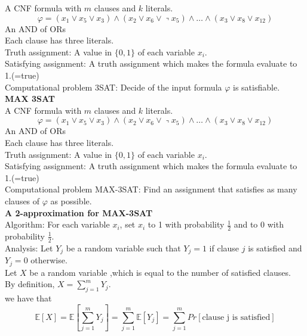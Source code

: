 \documentclass[onecolumn]{report}
\begin{document}
A CNF formula with $m$ clauses and $k$ literals.\\
\begin{equation*}
   \left.\varphi=\left(x_1 \vee x_5 \vee x_3\right) \wedge\left(x_2 \vee x_6 \vee\right\urcorner x_5 \right) \wedge \ldots \wedge\left(x_3 \vee x_8 \vee x_{12}\right)
\end{equation*}
An AND of ORs\\
Each clause has three literals.\\
Truth assignment: A value in $\{0,1\}$ of each variable $x_i$.\\
Satisfying assignment: A truth assignment which makes the formula evaluate to 1.(=true)\\
Computational problem 3SAT: Decide of the input formula $\varphi$ is satisfiable.\\
\textbf{MAX 3SAT}\\
A CNF formula with $m$ clauses and $k$ literals.\\
\begin{equation*}
   \left.\varphi=\left(x_1 \vee x_5 \vee x_3\right) \wedge\left(x_2 \vee x_6 \vee\right\urcorner x_5 \right) \wedge \ldots \wedge\left(x_3 \vee x_8 \vee x_{12}\right)
\end{equation*}
An AND of ORs\\
Each clause has three literals.\\
Truth assignment: A value in $\{0,1\}$ of each variable $x_i$.\\
Satisfying assignment: A truth assignment which makes the formula evaluate to 1.(=true)\\
Computational problem MAX-3SAT: Find an assignment that satisfies as many clauses of $\varphi$ as possible.\\
\textbf{A 2-approximation for MAX-3SAT}\\
Algorithm: For each variable $x_i$, set $x_i$ to 1 with probability $\frac{1}{2}$ and to 0 with probability $\frac{1}{2}$.\\
Analysis: Let $Y_j$ be a random variable such that $Y_j = 1$ if clause $j$ is satisfied and $Y_j = 0$ otherwise.\\
Let $X$ be a random variable ,which is equal to the number of satisfied clauses.\\
By definition, $X = \sum_{j=1}^m Y_j$.\\
we have that 
\begin{equation*}
    \mathbb{E}[X] = \mathbb{E}[\sum_{j=1}^m Y_j] = \sum_{j=1}^m \mathbb{E}[Y_j]= \sum_{j=1}^m Pr[\text{clause j is satisfied}]
\end{equation*}
\end{document}
